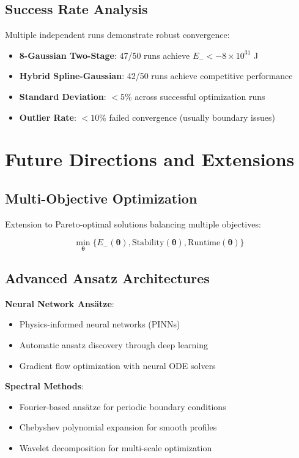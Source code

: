 \documentclass[11pt,a4paper]{article}
\begin{document}
\subsection{Success Rate Analysis}

Multiple independent runs demonstrate robust convergence:

\begin{itemize}
\item \textbf{8-Gaussian Two-Stage}: 47/50 runs achieve $E_- < -8 \times 10^{31}$ J
\item \textbf{Hybrid Spline-Gaussian}: 42/50 runs achieve competitive performance
\item \textbf{Standard Deviation}: $< 5\%$ across successful optimization runs
\item \textbf{Outlier Rate}: $< 10\%$ failed convergence (usually boundary issues)
\end{itemize}

\section{Future Directions and Extensions}

\subsection{Multi-Objective Optimization}

Extension to Pareto-optimal solutions balancing multiple objectives:

\begin{equation}
\min_{\boldsymbol{\theta}} \{E_-(\boldsymbol{\theta}), \text{Stability}(\boldsymbol{\theta}), \text{Runtime}(\boldsymbol{\theta})\}
\end{equation}

\subsection{Advanced Ansatz Architectures}

\textbf{Neural Network Ansätze}:
\begin{itemize}
\item Physics-informed neural networks (PINNs)
\item Automatic ansatz discovery through deep learning
\item Gradient flow optimization with neural ODE solvers
\end{itemize}

\textbf{Spectral Methods}:
\begin{itemize}
\item Fourier-based ansätze for periodic boundary conditions
\item Chebyshev polynomial expansion for smooth profiles
\item Wavelet decomposition for multi-scale optimization
\end{itemize}
\end{document}
